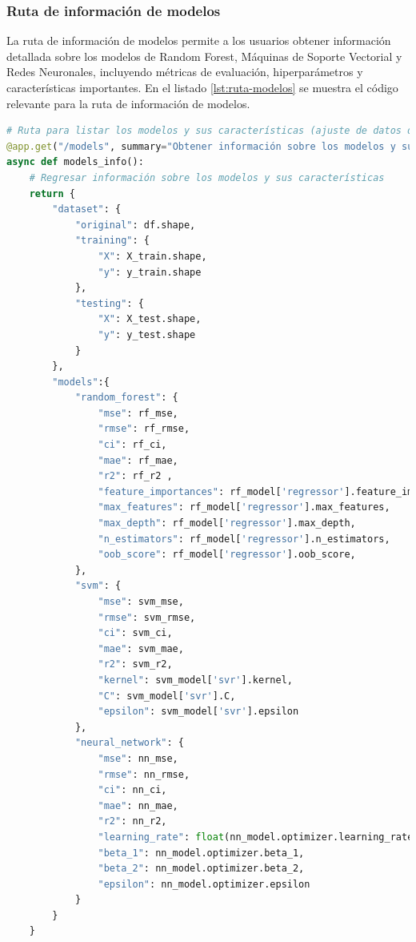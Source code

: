 \subsubsection{Ruta de información de modelos}
La ruta de información de modelos permite a los usuarios obtener información detallada
sobre los modelos de Random Forest, Máquinas de Soporte Vectorial y Redes Neuronales,
incluyendo métricas de evaluación, hiperparámetros y características importantes. En el
listado \ref{lst:ruta-modelos} se muestra el código relevante para la ruta de información
de modelos.

\begin{lstlisting}[language=python, caption={Ruta de información de modelos}, label={lst:ruta-modelos}]
# Ruta para listar los modelos y sus características (ajuste de datos de entrenamiento, hiperparámetros, etc.)
@app.get("/models", summary="Obtener información sobre los modelos y sus características", description="Obtener información sobre los modelos de aprendizaje automático utilizados en la API, incluyendo sus características, ajuste de datos de entrenamiento, hiperparámetros, etc.", tags=["Modelos"], response_description="Información sobre los modelos y sus características", response_model=ModelsResponse)
async def models_info():
    # Regresar información sobre los modelos y sus características
    return {
        "dataset": {
            "original": df.shape,
            "training": {
                "X": X_train.shape,
                "y": y_train.shape
            },
            "testing": {
                "X": X_test.shape,
                "y": y_test.shape
            }
        },
        "models":{
            "random_forest": {
                "mse": rf_mse,
                "rmse": rf_rmse,
                "ci": rf_ci,
                "mae": rf_mae,
                "r2": rf_r2 ,
                "feature_importances": rf_model['regressor'].feature_importances_.tolist(),
                "max_features": rf_model['regressor'].max_features,
                "max_depth": rf_model['regressor'].max_depth,
                "n_estimators": rf_model['regressor'].n_estimators,
                "oob_score": rf_model['regressor'].oob_score,
            },
            "svm": {
                "mse": svm_mse,
                "rmse": svm_rmse,
                "ci": svm_ci,
                "mae": svm_mae,
                "r2": svm_r2,
                "kernel": svm_model['svr'].kernel,
                "C": svm_model['svr'].C,
                "epsilon": svm_model['svr'].epsilon
            },
            "neural_network": {
                "mse": nn_mse,
                "rmse": nn_rmse,
                "ci": nn_ci,
                "mae": nn_mae,
                "r2": nn_r2,
                "learning_rate": float(nn_model.optimizer.learning_rate.numpy()),
                "beta_1": nn_model.optimizer.beta_1,
                "beta_2": nn_model.optimizer.beta_2,
                "epsilon": nn_model.optimizer.epsilon
            }
        }
    }
\end{lstlisting}

